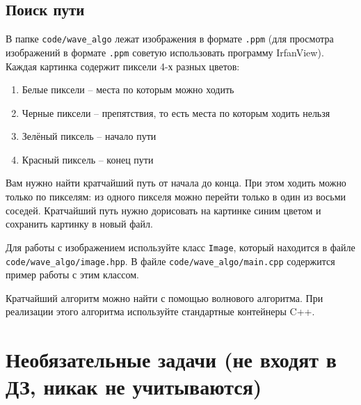 \documentclass{article}
\begin{document}
\subsection{Поиск пути}
В папке \texttt{code/wave\_algo} лежат изображения в формате \texttt{.ppm} (для просмотра изображений в формате \texttt{.ppm} советую использовать программу IrfanView).  Каждая картинка содержит пиксели 4-х разных цветов:
\begin{enumerate}
\item Белые пиксели -- места по которым можно ходить
\item Черные пиксели -- препятствия, то есть места по которым ходить нельзя
\item Зелёный пиксель -- начало пути
\item Красный пиксель -- конец пути
\end{enumerate}
Вам нужно найти кратчайший путь от начала до конца. При этом ходить можно только по пикселям: из одного пикселя можно перейти только в один из восьми соседей.
Кратчайший путь нужно дорисовать на картинке синим цветом и сохранить картинку в новый файл. 

Для работы с изображением используйте класс \texttt{Image}, который находится в файле \texttt{code/wave\_algo/image.hpp}. В файле \texttt{code/wave\_algo/main.cpp} содержится пример работы с этим классом.

Кратчайший алгоритм можно найти с помощью волнового алгоритма. При реализации этого алгоритма используйте стандартные контейнеры C++.



\newpage
\section*{Необязательные задачи (не входят в ДЗ, никак не учитываются)}
\setcounter{subsection}{0}
\end{document}
